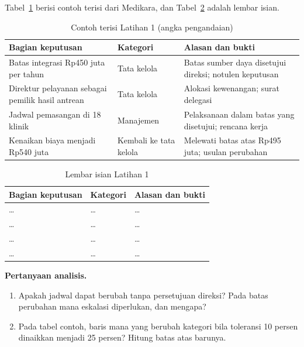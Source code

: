 Tabel~\ref{tab:ch01-lat1-contoh} berisi contoh terisi dari Medikara, dan
Tabel~\ref{tab:ch01-lat1-hasil} adalah lembar isian.
\begin{table}[!htb]
  \centering\small
  \caption{Contoh terisi Latihan 1 (angka pengandaian)}\label{tab:ch01-lat1-contoh}
  \begin{tabularx}{\textwidth}{|>{\raggedright\arraybackslash}p{}|>{\raggedright\arraybackslash}p{}|>{\raggedright\arraybackslash}X|}
    \hline
    \textbf{Bagian keputusan} & \textbf{Kategori} & \textbf{Alasan dan bukti} \\ \hline
    Batas integrasi Rp450 juta per tahun & Tata kelola & Batas sumber daya disetujui
    direksi; notulen keputusan \\ \hline
    Direktur pelayanan sebagai pemilik hasil antrean & Tata kelola & Alokasi kewenangan; surat
    delegasi \\ \hline
    Jadwal pemasangan di 18 klinik & Manajemen & Pelaksanaan dalam batas yang disetujui;
    rencana kerja \\ \hline
    Kenaikan biaya menjadi Rp540 juta & Kembali ke tata kelola & Melewati batas atas Rp495
    juta; usulan perubahan \\ \hline
  \end{tabularx}
\end{table}

\begin{table}[!htb]
  \centering\small
  \caption{Lembar isian Latihan 1}\label{tab:ch01-lat1-hasil}
  \begin{tabularx}{\textwidth}{|>{\raggedright\arraybackslash}p{}|>{\raggedright\arraybackslash}p{}|>{\raggedright\arraybackslash}X|}
    \hline
    \textbf{Bagian keputusan} & \textbf{Kategori} & \textbf{Alasan dan bukti} \\ \hline
    \dots & \dots & \dots \\ \hline
    \dots & \dots & \dots \\ \hline
    \dots & \dots & \dots \\ \hline
    \dots & \dots & \dots \\ \hline
  \end{tabularx}
\end{table}

\textbf{Pertanyaan analisis.}
\begin{enumerate}
  \item Apakah jadwal dapat berubah tanpa persetujuan direksi? Pada batas perubahan mana
  eskalasi diperlukan, dan mengapa?
  \item Pada tabel contoh, baris mana yang berubah kategori bila toleransi 10 persen dinaikkan
  menjadi 25 persen? Hitung batas atas barunya.
\end{enumerate}

